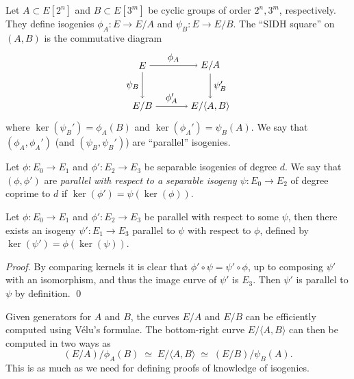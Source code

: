 Let $A \subset E[2^n]$ and $B \subset E[3^m]$ be cyclic groups of order $2^n, 3^m$, respectively.
They define isogenies $\phi_A : E \to E/A$ and $\psi_B : E \to E/B$.
The ``SIDH square'' on $(A,B)$ is the commutative diagram 
%
\begin{equation}
    \label{eq:sidh-square}
    \tikz[x=2.5cm,y=-1.5cm,baseline=-.75cm]{
    \node (E0) at (0,0) {$E$};
    \node (E1) at (1,0) {$E/A$};
    \node (E2) at (0,1) {$E/B$};
    \node (E3) at (1,1) {$E/\langle A, B\rangle$};
    \draw[->] (E0) edge node[above] {$\phi_A$} (E1)
    (E0) edge node[left] {$\psi_B$} (E2)
    (E1) edge node[right] {$\psi_B'$} (E3)
    (E2) edge node[above] {$\phi_A'$} (E3);
    }
\end{equation}
where $\ker(\psi_B')  = \phi_A(B)$ and $\ker( \phi_A' ) = \psi_B(A)$.
%
We say that $(\phi_A,\phi_A')$ (and $(\psi_B,\psi_B')$) are ``parallel'' isogenies.

\begin{definition}
  Let $\phi : E_0 \to E_1$ and $\phi' : E_2 \to E_3$ be separable isogenies of degree $d$.
  We say that $(\phi,\phi')$ are \emph{parallel with respect to a separable isogeny $\psi : E_0 \to E_2$} of degree coprime to $d$ if $\ker(\phi') = \psi(\ker(\phi))$.
\end{definition}

\begin{lemma}
  Let $\phi : E_0 \to E_1$ and $\phi' : E_2 \to E_3$ be parallel with respect to some $\psi$, then there exists an isogeny $\psi' : E_1 \to E_3$ parallel to $\psi$ with respect to $\phi$, defined by $\ker(\psi') = \phi(\ker(\psi))$.
\end{lemma}
\begin{proof}
  By comparing kernels it is clear that $\phi' \circ \psi = \psi' \circ \phi$, up to composing $\psi'$ with an isomorphism, and thus the image curve of $\psi'$ is $E_3$.
  Then $\psi'$ is parallel to $\psi$ by definition. \qed
\end{proof}

Given generators for $A$ and $B$, the curves $E/A$ and $E/B$ can be efficiently computed using Vélu's formulae.
The bottom-right curve $E/\langle A,B\rangle$ can then be computed in two ways as
\begin{equation}
  \label{eq:sidh-push}
  (E/A)/\phi_A(B) \;\simeq\; E/\langle A,B\rangle \;\simeq\; (E/B)/\psi_B(A).
\end{equation}
This is as much as we need for defining proofs of knowledge of isogenies.

